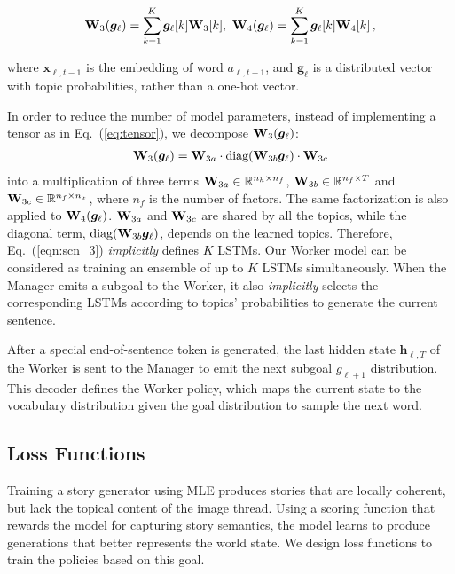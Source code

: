 \documentclass[letterpaper]{article} \usepackage{aaai19}  \usepackage{times}  \usepackage{helvet}  \usepackage{courier}  \usepackage{url}  \usepackage{graphicx}
\newcommand{\Wmat}{{\bf W}}
\newcommand{\gv}{{\boldsymbol g}}
\newcommand{\hv}{{\boldsymbol h}}
\newcommand{\xv}{{\boldsymbol x}}
\newcommand{\R}{\mathbb{R}}
\begin{document}
\begin{adjustbox}{minipage=1.08\linewidth,scale=0.93}
	\begin{align}
		\Wmat_3(\gv_{\ell}) =  \sum_{k=1}^K \gv_{\ell}[k]\Wmat_3[k], \,\, \Wmat_4(\gv_{\ell}) = \sum_{k=1}^K \gv_{\ell}[k] \Wmat_4[k] \label{eq:tensor}\,,
	\end{align}
\end{adjustbox}
where $\xv_{\ell,t-1}$ is the embedding of word $a_{\ell,t-1}$, and $\gv_{\ell}$ is a distributed vector with topic probabilities, rather than a one-hot vector. 

In order to reduce the number of model parameters, instead of implementing a tensor as in Eq.~(\ref{eq:tensor}), we decompose $\Wmat_3(\gv_{\ell})$:
\begin{align}
	\Wmat_3(\gv_{\ell}) = \Wmat_{3a} \cdot \text{diag}(\Wmat_{3b}\gv_{\ell}) \cdot \Wmat_{3c}
	\label{eqn:scn_3} 
\end{align}
into a multiplication of three terms $\Wmat_{3a}\in \R^{n_h\times n_f}$, $\Wmat_{3b}\in \R^{n_f\times T}$ and $\Wmat_{3c}\in \R^{n_f\times n_x}$, where $n_f$ is the number of factors.
The same factorization is also applied to $\Wmat_4(\gv_{\ell})$. 
$\Wmat_{3a}$ and $\Wmat_{3c}$ are shared by all the topics, while the diagonal term, $\textrm{diag}(\Wmat_{3b}\gv_{\ell})$, depends on the learned topics. Therefore, Eq.~(\ref{eqn:scn_3}) \emph{implicitly} defines $K$ LSTMs. Our Worker model can be considered as training an ensemble of up to $K$ LSTMs simultaneously.
When the Manager emits a subgoal to the Worker, it also \emph{implicitly} selects the corresponding LSTMs according to  topics' probabilities to generate the current sentence.

After a special end-of-sentence token is generated, the last hidden state $\hv_{\ell,T}$ of the Worker is sent to the Manager to emit the next subgoal $g_{\ell+1}$ distribution. 
This decoder defines the Worker policy,  which maps the current state to the vocabulary distribution given the goal distribution to sample the next word.
\subsection{Loss Functions}
Training a story generator using MLE produces stories that are locally coherent, but lack the topical content of the image thread. Using a scoring function that rewards the model for capturing story semantics, the model learns to produce generations that better represents the world state. We design loss functions to train the policies based on this goal. 
\end{document}
